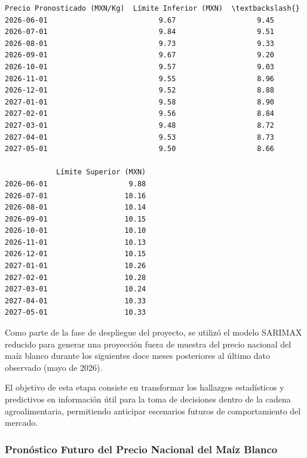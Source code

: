 \documentclass[11pt]{article}
\makeatletter
\newcommand{\boxspacing}{\kern\kvtcb@left@rule\kern\kvtcb@boxsep}
\newcommand{\prompt}[4]{
        {\ttfamily\llap{{\color{#2}[#3]:\hspace{3pt}#4}}\vspace{-\baselineskip}}
    }
\makeatother
\begin{document}
            \begin{tcolorbox}[breakable, size=fbox, boxrule=.5pt, pad at break*=1mm, opacityfill=0]
\prompt{Out}{outcolor}{209}{\boxspacing}
\begin{Verbatim}[commandchars=\\\{\}]
            Precio Pronosticado (MXN/Kg)  Límite Inferior (MXN)  \textbackslash{}
2026-06-01                          9.67                   9.45
2026-07-01                          9.84                   9.51
2026-08-01                          9.73                   9.33
2026-09-01                          9.67                   9.20
2026-10-01                          9.57                   9.03
2026-11-01                          9.55                   8.96
2026-12-01                          9.52                   8.88
2027-01-01                          9.58                   8.90
2027-02-01                          9.56                   8.84
2027-03-01                          9.48                   8.72
2027-04-01                          9.53                   8.73
2027-05-01                          9.50                   8.66

            Límite Superior (MXN)
2026-06-01                   9.88
2026-07-01                  10.16
2026-08-01                  10.14
2026-09-01                  10.15
2026-10-01                  10.10
2026-11-01                  10.13
2026-12-01                  10.15
2027-01-01                  10.26
2027-02-01                  10.28
2027-03-01                  10.24
2027-04-01                  10.33
2027-05-01                  10.33
\end{Verbatim}
\end{tcolorbox}
        
    Como parte de la fase de despliegue del proyecto, se utilizó el modelo
SARIMAX reducido para generar una proyección fuera de muestra del precio
nacional del maíz blanco durante los siguientes doce meses posteriores
al último dato observado (mayo de 2026).

El objetivo de esta etapa consiste en transformar los hallazgos
estadísticos y predictivos en información útil para la toma de
decisiones dentro de la cadena agroalimentaria, permitiendo anticipar
escenarios futuros de comportamiento del mercado.

\hypertarget{pronuxf3stico-futuro-del-precio-nacional-del-mauxedz-blanco}{%
\subsubsection{Pronóstico Futuro del Precio Nacional del Maíz
Blanco}\label{pronuxf3stico-futuro-del-precio-nacional-del-mauxedz-blanco}}
\end{document}
